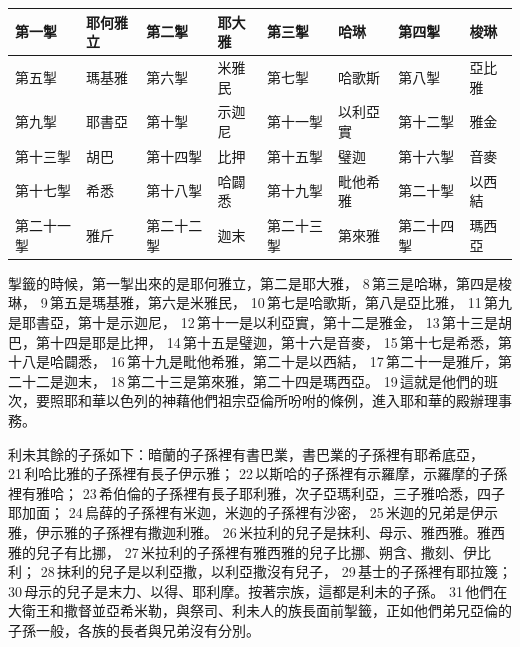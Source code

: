\begin{table}[!hbp]
\centering
\begin{tabular}{p{2cm}|p{1.5cm}|p{2cm}|p{1.3cm}|p{2cm}|p{1.5cm}|p{1.9cm}|p{1.3cm}}\hline\hline
第一掣  &耶何雅立  & 第二掣 &耶大雅  & 第三掣 &哈琳&第四掣& 梭琳\\\hline
第五掣  &瑪基雅  & 第六掣 &米雅民  & 第七掣 &哈歌斯&第八掣&亞比雅\\\hline
第九掣  &耶書亞  & 第十掣 &示迦尼  & 第十一掣 &以利亞實&第十二掣&雅金\\\hline
第十三掣  &胡巴  & 第十四掣 &比押  & 第十五掣 &璧迦&第十六掣&音麥\\\hline
第十七掣  &希悉  & 第十八掣 &哈闢悉  & 第十九掣 &毗他希雅&第二十掣&以西結\\\hline
第二十一掣  &雅斤  & 第二十二掣 &迦末  & 第二十三掣 &第來雅&第二十四掣&瑪西亞\\\hline
\end{tabular}
\end{table}	 
掣籤的時候，第一掣出來的是耶何雅立，第二是耶大雅， 8 第三是哈琳，第四是梭琳， 9 第五是瑪基雅，第六是米雅民， 10 第七是哈歌斯，第八是亞比雅， 11 第九是耶書亞，第十是示迦尼， 12 第十一是以利亞實，第十二是雅金， 13 第十三是胡巴，第十四是耶是比押， 14 第十五是璧迦，第十六是音麥， 15 第十七是希悉，第十八是哈闢悉， 16 第十九是毗他希雅，第二十是以西結， 17 第二十一是雅斤，第二十二是迦末， 18 第二十三是第來雅，第二十四是瑪西亞。 19 這就是他們的班次，要照耶和華以色列的神藉他們祖宗亞倫所吩咐的條例，進入耶和華的殿辦理事務。

利未其餘的子孫如下：暗蘭的子孫裡有書巴業，書巴業的子孫裡有耶希底亞， 21 利哈比雅的子孫裡有長子伊示雅； 22 以斯哈的子孫裡有示羅摩，示羅摩的子孫裡有雅哈； 23 希伯倫的子孫裡有長子耶利雅，次子亞瑪利亞，三子雅哈悉，四子耶加面； 24 烏薛的子孫裡有米迦，米迦的子孫裡有沙密， 25 米迦的兄弟是伊示雅，伊示雅的子孫裡有撒迦利雅。 26 米拉利的兒子是抹利、母示、雅西雅。雅西雅的兒子有比挪， 27 米拉利的子孫裡有雅西雅的兒子比挪、朔含、撒刻、伊比利； 28 抹利的兒子是以利亞撒，以利亞撒沒有兒子， 29 基士的子孫裡有耶拉篾； 30 母示的兒子是末力、以得、耶利摩。按著宗族，這都是利未的子孫。 31 他們在大衛王和撒督並亞希米勒，與祭司、利未人的族長面前掣籤，正如他們弟兄亞倫的子孫一般，各族的長者與兄弟沒有分別。


